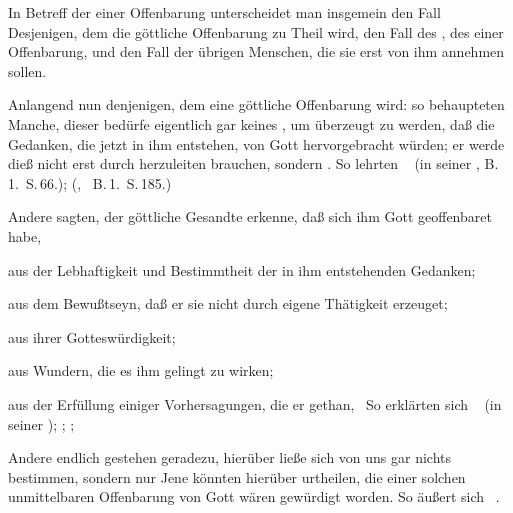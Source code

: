 \begin{aufza}
\item In Betreff der  einer Offenbarung unterscheidet man insgemein den Fall Desjenigen, dem die göttliche Offenbarung  zu Theil wird, den Fall des , des  einer Offenbarung, und den Fall der übrigen Menschen, die sie erst  von ihm annehmen sollen.
\item Anlangend nun denjenigen, dem eine göttliche Offenbarung  wird: so behaupteten Manche, dieser bedürfe eigentlich gar keines , um überzeugt zu werden, daß die Gedanken, die jetzt in ihm entstehen,  von Gott hervorgebracht würden; er werde dieß nicht erst durch  herzuleiten brauchen, sondern . So lehrten \zB\  (in seiner , B.\,1.\ S.\,66.);  (, \usw\ B.\,1.\ S.\,185.) 
\item Andere sagten, der göttliche Gesandte erkenne, daß sich ihm Gott geoffenbaret habe,
\begin{aufzb}
\item aus der Lebhaftigkeit und Bestimmtheit der in ihm entstehenden Gedanken;
\item aus dem Bewußtseyn, daß er sie nicht durch eigene Thätigkeit erzeuget;
\item aus ihrer Gotteswürdigkeit;
\item aus Wundern, die es ihm gelingt zu wirken;
\item aus der Erfüllung einiger Vorhersagungen, die er gethan, \udgl\ So erklärten sich \zB\  (in seiner ); ; ; \uA 
\end{aufzb}
\item Andere endlich gestehen geradezu, hierüber ließe sich von uns gar nichts bestimmen, sondern nur Jene könnten hierüber urtheilen, die einer solchen unmittelbaren Offenbarung von Gott wären gewürdigt worden. So äußert sich \zB\ .
\end{aufza}


